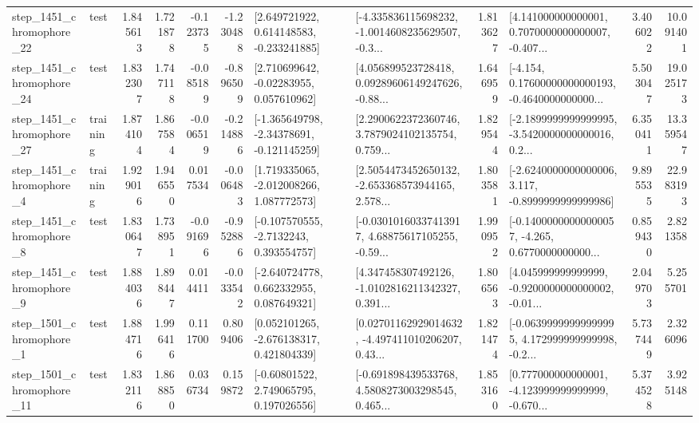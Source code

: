\begin{tabular}{llrrrrllrlrr}
 step\_1451\_chromophore\_22 &      test &      1.845613 &    1.721878 &     -0.123735 & -1.230488 &    [2.649721922, 0.614148583, -0.233241885] &  [-4.335836115698232, -1.0014608235629507, -0.3... &       1.813627 &  [4.141000000000001, 0.7070000000000007, -0.407... &            3.406022 &         10.091401 \\
 step\_1451\_chromophore\_24 &      test &      1.832307 &    1.747118 &     -0.085189 & -0.896509 &     [2.710699642, -0.02283955, 0.057610962] &  [4.056899523728418, 0.09289606149247626, -0.88... &       1.646959 &  [-4.154, 0.17600000000000193, -0.4640000000000... &            5.503047 &         19.025173 \\
 step\_1451\_chromophore\_27 &  training &      1.874104 &    1.867584 &     -0.006519 & -0.214886 &   [-1.365649798, -2.34378691, -0.121145259] &  [2.2900622372360746, 3.7879024102135754, 0.759... &       1.829544 &  [-2.1899999999999995, -3.5420000000000016, 0.2... &            6.350411 &         13.359547 \\
  step\_1451\_chromophore\_4 &  training &      1.929016 &    1.946550 &      0.017534 & -0.006483 &    [1.719335065, -2.012008266, 1.087772573] &  [2.5054473452650132, -2.653368573944165, 2.578... &       1.803581 &  [-2.6240000000000006, 3.117, -0.8999999999999986] &            9.895535 &         22.983193 \\
  step\_1451\_chromophore\_8 &      test &      1.830647 &    1.738951 &     -0.091696 & -0.952886 &     [-0.107570555, -2.7132243, 0.393554757] &  [-0.03010160337413917, 4.68875617105255, -0.59... &       1.990952 &  [-0.14000000000000057, -4.265, 0.6770000000000... &            0.859430 &          2.821358 \\
  step\_1451\_chromophore\_9 &      test &      1.884036 &    1.898447 &      0.014411 & -0.033542 &    [-2.640724778, 0.662332955, 0.087649321] &  [4.347458307492126, -1.0102816211342327, 0.391... &       1.806563 &  [4.045999999999999, -0.9200000000000002, -0.01... &            2.049703 &          5.255701 \\
  step\_1501\_chromophore\_1 &      test &      1.884716 &    1.996416 &      0.111700 &  0.809406 &    [0.052101265, -2.676138317, 0.421804339] &  [0.02701162929014632, -4.497411010206207, 0.43... &       1.821474 &  [-0.06399999999999995, 4.172999999999998, -0.2... &            5.737449 &          2.326096 \\
 step\_1501\_chromophore\_11 &      test &      1.832116 &    1.868850 &      0.036734 &  0.159872 &     [-0.60801522, 2.749065795, 0.197026556] &  [-0.691898439533768, 4.5808273003298545, 0.465... &       1.853160 &  [0.777000000000001, -4.123999999999999, -0.670... &            5.374528 &          3.925148 \\

\end{tabular}
